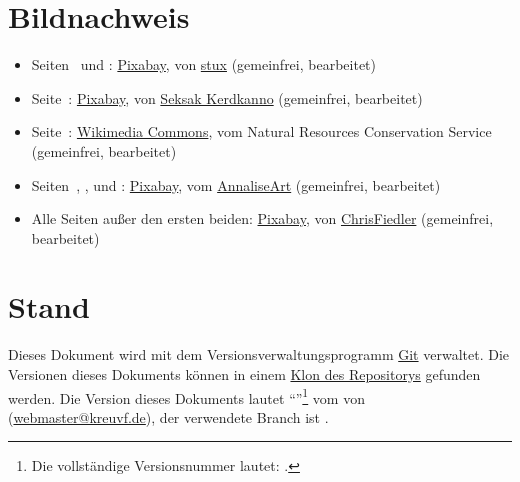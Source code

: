 \section{Bildnachweis}
\begin{itemize}
	\item Seiten~\pageref{img-title} und \pageref{img-title-grey}: \href{https://pixabay.com/images/id-437262/}{Pixabay}, von \href{https://pixabay.com/users/stux-12364/}{stux} (gemeinfrei, bearbeitet)
	\item Seite~\pageref{img-herbs-title}: \href{https://pixabay.com/images/id-906140/}{Pixabay}, von \href{https://pixabay.com/users/kerdkanno-1334070/}{Seksak Kerdkanno} (gemeinfrei, bearbeitet)
	\item Seite~\pageref{img-white-lotus}: \href{https://commons.wikimedia.org/w/index.php?title=File:Nelumbo_lutea_blossom.jpeg&oldid=141771386}{Wikimedia Commons}, vom Natural Resources Conservation Service (gemeinfrei, bearbeitet)
	\item Seiten~\pageref{img-divider-a}, \pageref{img-divider-b}, \pageref{img-divider-c} und \pageref{img-divider-d}: \href{https://pixabay.com/images/id-4869416/}{Pixabay}, vom \href{https://pixabay.com/users/AnnaliseArt-7089643/}{AnnaliseArt} (gemeinfrei, bearbeitet)
	\item Alle Seiten außer den ersten beiden: \href{https://pixabay.com/images/id-1074131/}{Pixabay}, von \href{https://pixabay.com/users/ChrisFiedler-935884/}{ChrisFiedler} (gemeinfrei, bearbeitet)

\end{itemize}

\section{Stand\label{version-info}}
Dieses Dokument wird mit dem Versionsverwaltungsprogramm \href{https://git-scm.com/}{Git} verwaltet. Die Versionen dieses Dokuments können in einem \href{https://github.com/kreuvf/dsa-sucht-drogen}{Klon des Repositorys} gefunden werden. Die Version dieses Dokuments lautet \enquote{\gitAbbrevHash{}}\footnote{Die vollständige Versionsnummer lautet: \gitHash{}.} vom \gitAuthorIsoDate{} von \gitAuthorName{} (\href{mailto:webmaster@kreuvf.de}{webmaster@kreuvf.de}), der verwendete Branch ist \gitBranch.

